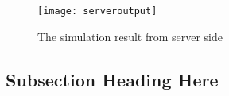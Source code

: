 \documentclass[conference]{IEEEtran}
\begin{document}
\begin{figure}
    \centering
    \texttt{[image: serveroutput]}
    \caption{The simulation result from server side}
    \label{fig:my_label}
\end{figure}

\subsection{Subsection Heading Here}
\blindtext


%
%



%
%
\end{document}
